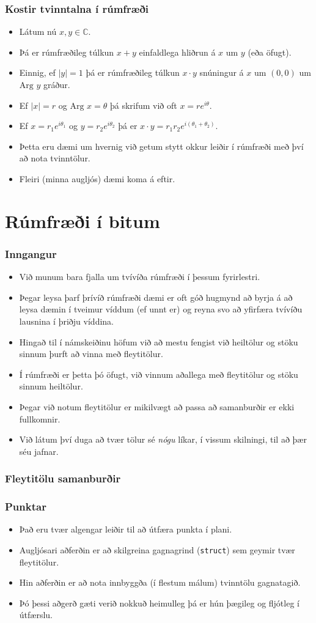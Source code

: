 \documentclass{beamer}
\newcommand\env[2]
{
	\begin{#1}
	#2
	\end{#1}
}
\newcommand\code[1]{\tiny}
\begin{document}
\env{frame}
{
	\frametitle{Kostir tvinntalna í rúmfræði}
	\env{itemize}
	{
		\item<1-> Látum nú $x, y \in \mathbb{C}$.
		\item<2-> Þá er rúmfræðileg túlkun $x + y$ einfaldlega hliðrun á $x$ um $y$ (eða öfugt).
		\item<3-> Einnig, ef $|y| = 1$ þá er rúmfræðileg túlkun $x \cdot y$ snúningur á $x$ um $(0, 0)$ um $\text{Arg } y$ gráður.
		\item<4-> Ef $|x| = r$ og $\text{Arg } x = \theta$ þá skrifum við oft $x = re^{i\theta}$.
		\item<5-> Ef $x = r_1e^{i\theta_1}$ og $y = r_2e^{i\theta_2}$ þá er $x \cdot y = r_1r_2e^{i(\theta_1 + \theta_2)}$.
		\item<6-> Þetta eru dæmi um hvernig við getum stytt okkur leiðir í rúmfræði með því að nota tvinntölur.
		\item<7-> Fleiri (minna augljós) dæmi koma á eftir.
	}
}

\section[Rúmfræði í bitum]{Rúmfræði í bitum}

\env{frame}
{
	\frametitle{Inngangur}
	\env{itemize}
	{
		\item<1-> Við munum bara fjalla um tvívíða rúmfræði í þessum fyrirlestri.
		\item<2-> Þegar leysa þarf þrívíð rúmfræði dæmi er oft góð hugmynd að byrja
			á að leysa dæmin í tveimur víddum (ef unnt er) og reyna svo að yfirfæra
			tvívíðu lausnina í þriðju víddina.
		\item<3-> Hingað til í námskeiðinu höfum við að mestu fengist við heiltölur
			og stöku sinnum þurft að vinna með fleytitölur.
		\item<4-> Í rúmfræði er þetta þó öfugt, við vinnum aðallega með fleytitölur og
			stöku sinnum heiltölur.
		\item<5-> Þegar við notum fleytitölur er mikilvægt að passa að samanburðir er
			ekki fullkomnir.
		\item<6-> Við látum því duga að tvær tölur sé \emph{nógu} líkar, í vissum skilningi, til að þær séu jafnar.
	}
}

\begin{frame}[fragile]
	\frametitle{Fleytitölu samanburðir}
	\code{comp.h}
\end{frame}

\env{frame}
{
	\frametitle{Punktar}
	\env{itemize}
	{
		\item<1-> Það eru tvær algengar leiðir til að útfæra punkta í plani.
		\item<2-> Augljósari aðferðin er að skilgreina gagnagrind (\texttt{struct}) sem geymir
			tvær fleytitölur.
		\item<3-> Hin aðferðin er að nota innbyggða (í flestum málum) tvinntölu gagnatagið.
		\item<4-> Þó þessi aðgerð gæti verið nokkuð heimulleg þá er hún þægileg og fljótleg í útfærslu.
	}
}
\end{document}
